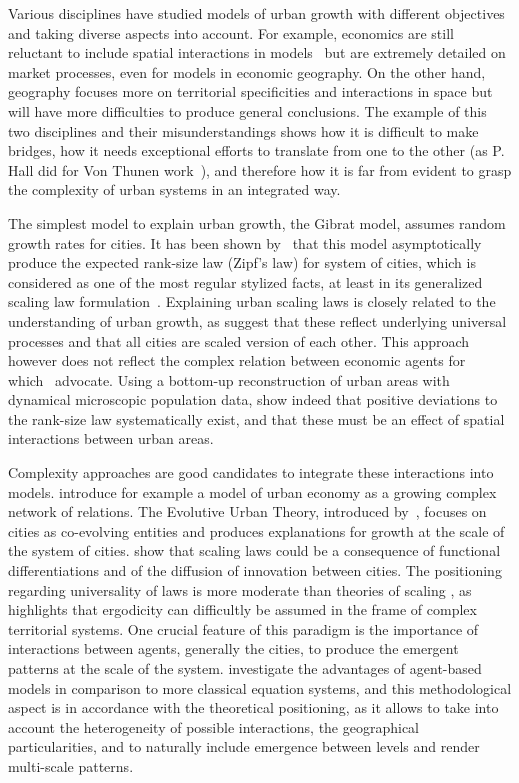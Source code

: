 \documentclass[Royal,sageh,times]{sagej}
\begin{document}
Various disciplines have studied models of urban growth with different objectives and taking diverse aspects into account. For example, economics are still reluctant to include spatial interactions in models~\citep{krugman1998space} but are extremely detailed on market processes, even for models in economic geography. On the other hand, geography focuses more on territorial specificities and interactions in space but will have more difficulties to produce general conclusions. The example of this two disciplines and their misunderstandings \citep{marchionni2004geographical} shows how it is difficult to make bridges, how it needs exceptional efforts to translate from one to the other (as P. Hall did for Von Thunen work~\citep{taylor2016polymath}), and therefore how it is far from evident to grasp the complexity of urban systems in an integrated way.


The simplest model to explain urban growth, the Gibrat model, assumes random growth rates for cities. It has been shown by~\cite{gabaix1999zipf} that this model asymptotically produce the expected rank-size law (Zipf's law) for system of cities, which is considered as one of the most regular stylized facts, at least in its generalized scaling law formulation~\citep{nitsch2005zipf}. Explaining urban scaling laws is closely related to the understanding of urban growth, as \cite{bettencourt2008large} suggest that these reflect underlying universal processes and that all cities are scaled version of each other. This approach however does not reflect the complex relation between economic agents for which~\cite{storper2009rethinking} advocate. Using a bottom-up reconstruction of urban areas with dynamical microscopic population data, \cite{rozenfeld2008laws} show indeed that positive deviations to the rank-size law systematically exist, and that these must be an effect of spatial interactions between urban areas. 

Complexity approaches are good candidates to integrate these interactions into models. \cite{andersson2006complex} introduce for example a model of urban economy as a growing complex network of relations. The Evolutive Urban Theory, introduced by~\cite{pumain1997pour}, focuses on cities as co-evolving entities and produces explanations for growth at the scale of the system of cities. \cite{pumain2006evolutionary} show that scaling laws could be a consequence of functional differentiations and of the diffusion of innovation between cities. The positioning regarding universality of laws is more moderate than theories of scaling \citep{west2017scale}, as \cite{pumain2012urban} highlights that ergodicity can difficultly be assumed in the frame of complex territorial systems. One crucial feature of this paradigm is the importance of interactions between agents, generally the cities, to produce the emergent patterns at the scale of the system. \cite{pumain2013theoretical} investigate the advantages of agent-based models in comparison to more classical equation systems, and this methodological aspect is in accordance with the theoretical positioning, as it allows to take into account the heterogeneity of possible interactions, the geographical particularities, and to naturally include emergence between levels and render multi-scale patterns.
\end{document}
